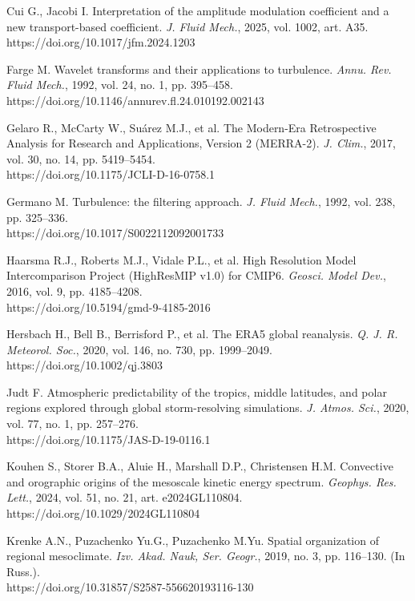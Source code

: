 \documentclass[12pt,a4paper]{article}
\begin{document}
\noindent Cui G., Jacobi I. Interpretation of the amplitude modulation coefficient and a new transport-based coefficient. \textit{J. Fluid Mech.}, 2025, vol. 1002, art. A35.\\ https://doi.org/10.1017/jfm.2024.1203

\noindent Farge M. Wavelet transforms and their applications to turbulence. \textit{Annu. Rev. Fluid Mech.}, 1992, vol. 24, no. 1, pp. 395–458.\\ https://doi.org/10.1146/annurev.fl.24.010192.002143

\noindent Gelaro R., McCarty W., Suárez M.J., et al. The Modern-Era Retrospective Analysis for Research and Applications, Version 2 (MERRA-2). \textit{J. Clim.}, 2017, vol. 30, no. 14, pp. 5419–5454.\\ https://doi.org/10.1175/JCLI-D-16-0758.1

\noindent Germano M. Turbulence: the filtering approach. \textit{J. Fluid Mech.}, 1992, vol. 238, pp. 325–336.\\ https://doi.org/10.1017/S0022112092001733

\noindent Haarsma R.J., Roberts M.J., Vidale P.L., et al. High Resolution Model Intercomparison Project (HighResMIP v1.0) for CMIP6. \textit{Geosci. Model Dev.}, 2016, vol. 9, pp. 4185–4208.\\ https://doi.org/10.5194/gmd-9-4185-2016

\noindent Hersbach H., Bell B., Berrisford P., et al. The ERA5 global reanalysis. \textit{Q. J. R. Meteorol. Soc.}, 2020, vol. 146, no. 730, pp. 1999–2049.\\ https://doi.org/10.1002/qj.3803

\noindent Judt F. Atmospheric predictability of the tropics, middle latitudes, and polar regions explored through global storm-resolving simulations. \textit{J. Atmos. Sci.}, 2020, vol. 77, no. 1, pp. 257–276.\\ https://doi.org/10.1175/JAS-D-19-0116.1

\noindent Kouhen S., Storer B.A., Aluie H., Marshall D.P., Christensen H.M. Convective and orographic origins of the mesoscale kinetic energy spectrum. \textit{Geophys. Res. Lett.}, 2024, vol. 51, no. 21, art. e2024GL110804.\\ https://doi.org/10.1029/2024GL110804

\noindent Krenke A.N., Puzachenko Yu.G., Puzachenko M.Yu. Spatial organization of regional mesoclimate. \textit{Izv. Akad. Nauk, Ser. Geogr.}, 2019, no. 3, pp. 116–130. (In Russ.).\\ https://doi.org/10.31857/S2587-556620193116-130
\end{document}
